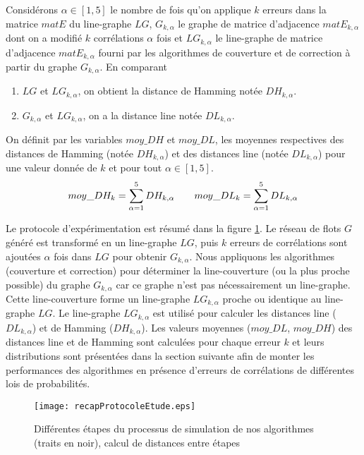 Consid\'erons 
  $\alpha \in [1, 5]$ le nombre de fois qu'on applique $k$ erreurs dans la matrice $matE$ du line-graphe $LG$,  
 $G_{k, \alpha}$ le graphe de matrice d'adjacence $matE_{k, \alpha}$ dont on a modifi\'e $k$ corr\'elations $\alpha$ fois et 
 $LG_{k, \alpha}$  le line-graphe de matrice d'adjacence $matE_{k, \alpha}$ fourni par les algorithmes de couverture et de correction \`a partir du graphe $G_{k, \alpha}$.
\newline
En comparant
\begin{enumerate}
\item  $LG$ et $LG_{k, \alpha}$, on obtient la distance de Hamming not\'ee $DH_{k,\alpha}$.
\item $G_{k,\alpha}$ et $LG_{k,\alpha}$, on a la distance line not\'ee $DL_{k,\alpha}$.
\end{enumerate}
On d\'efinit par les variables $moy\_DH$ et $moy\_DL$, les moyennes respectives des distances de Hamming (not\'ee $DH_{k,\alpha}$) et des distances line (not\'ee $DL_{k,\alpha}$) pour une valeur donn\'ee de $k$ et pour tout $\alpha \in [1, 5]$.
\begin{equation}
moy\_DH_k = \sum_{\alpha = 1}^{5} DH_{k, \alpha} \hspace{2 em}
moy\_DL_k = \sum_{\alpha = 1}^{5} DL_{k, \alpha}
\end{equation}

Le protocole d'exp\'erimentation est r\'esum\'e dans la figure \ref{recap_protocole_etude}. Le r\'eseau de flots $G$ g\'en\'er\'e est transform\'e en un line-graphe $LG$, puis $k$ erreurs de corr\'elations  sont ajout\'ees $\alpha$ fois dans $LG$ pour obtenir $G_{k,\alpha}$. Nous appliquons les algorithmes (couverture et correction) pour d\'eterminer la line-couverture (ou la plus proche possible) du graphe $G_{k,\alpha}$ car ce graphe n'est pas n\'ecessairement un line-graphe. Cette line-couverture forme un line-graphe $LG_{k, \alpha}$ proche ou identique au line-graphe $LG$. Le line-graphe $LG_{k, \alpha}$ est utilis\'e pour calculer les distances line ($DL_{k, \alpha}$) et de Hamming ($DH_{k, \alpha}$).
Les valeurs moyennes ($moy\_DL$, $moy\_DH$) des distances line et de Hamming sont calcul\'ees pour chaque erreur $k$ et leurs distributions sont pr\'esent\'ees dans la section suivante afin de monter les performances des algorithmes en pr\'esence d'erreurs de corr\'elations de diff\'erentes lois de probabilit\'es.
\begin{figure}[htb!] 
\centering
\texttt{[image: recapProtocoleEtude.eps]}
\caption{ Diff\'erentes \'etapes du processus de simulation de nos algorithmes (traits en noir), calcul de distances entre \'etapes}
\label{recap_protocole_etude} 
\end{figure}
